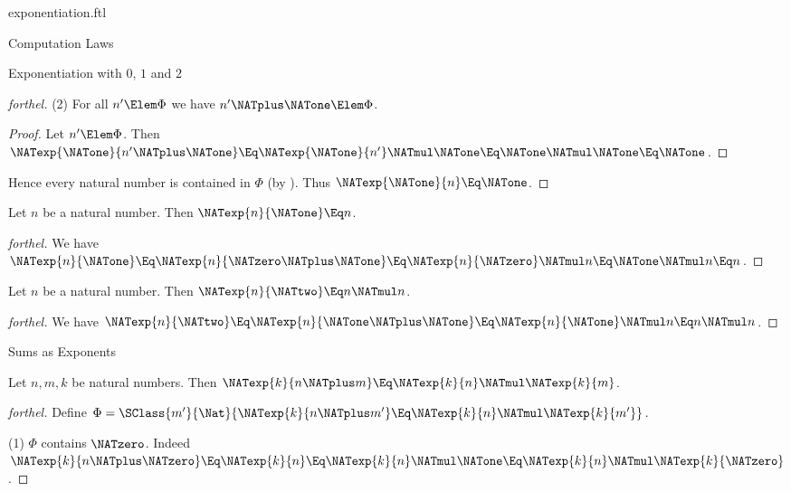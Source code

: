 \documentclass{stex}
\begin{document}
\begin{smodule}{exponentiation.ftl}
\begin{sfragment}{Computation Laws}
\begin{sfragment}{Exponentiation with $0$, $1$ and $2$}
\begin{proof}[forthel]
      (2) For all $n' \Elem \Phi$ we have $n' \NATplus \NATone \Elem \Phi$.
      \begin{proof}
        Let $n' \Elem \Phi$.
        Then $\NATexp{\NATone}{n' \NATplus \NATone}
          \Eq \NATexp{\NATone}{n'} \NATmul \NATone
          \Eq \NATone \NATmul \NATone
          \Eq \NATone$.
      \end{proof}

      Hence every natural number is contained in $\Phi$ (by ).
      Thus $\NATexp{\NATone}{n} \Eq \NATone$.
    \end{proof}

    \begin{proposition}[forthel,id=ARITHMETIC_09_4975279749464064]
      Let $n$ be a natural number.
      Then $\NATexp{n}{\NATone} \Eq n$.
    \end{proposition}
    \begin{proof}[forthel]
      We have $\NATexp{n}{\NATone}
        \Eq \NATexp{n}{\NATzero \NATplus \NATone}
        \Eq \NATexp{n}{\NATzero} \NATmul n
        \Eq \NATone \NATmul n
        \Eq n$.
    \end{proof}

    \begin{proposition}[forthel,id=ARITHMETIC_09_8513812055457792]
      Let $n$ be a natural number.
      Then $\NATexp{n}{\NATtwo} \Eq n \NATmul n$.
    \end{proposition}
    \begin{proof}[forthel]
      We have $\NATexp{n}{\NATtwo}
        \Eq \NATexp{n}{\NATone \NATplus \NATone}
        \Eq \NATexp{n}{\NATone} \NATmul n
        \Eq n \NATmul n$.
    \end{proof}
  \end{sfragment}

  \begin{sfragment}{Sums as Exponents}
    \begin{proposition}[forthel,id=ARITHMETIC_09_8152207530655744]
      Let $n, m, k$ be natural numbers.
      Then $\NATexp{k}{n \NATplus m} \Eq \NATexp{k}{n} \NATmul \NATexp{k}{m}$.
    \end{proposition}
    \begin{proof}[forthel]
      Define $\Phi = \SClass{m'}{\Nat}{\NATexp{k}{n \NATplus m'} \Eq \NATexp{k}{n} \NATmul \NATexp{k}{m'}}$.

      (1) $\Phi$ contains $\NATzero$.
      Indeed $\NATexp{k}{n \NATplus \NATzero}
        \Eq \NATexp{k}{n}
        \Eq \NATexp{k}{n} \NATmul \NATone
        \Eq \NATexp{k}{n} \NATmul \NATexp{k}{\NATzero}$.


\end{proof}
\end{sfragment}
\end{sfragment}
\end{smodule}
\end{document}
